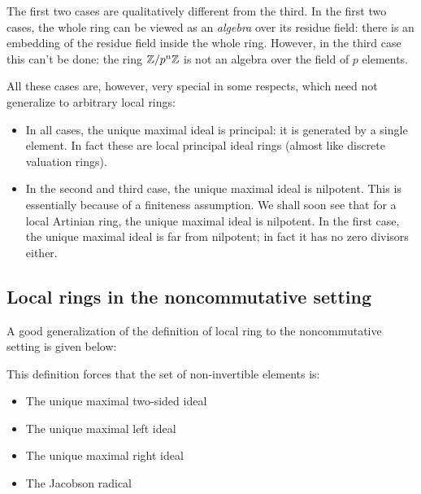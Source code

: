 \documentclass[a4paper]{amsart}
\begin{document}
The first two cases are qualitatively different from the third. In the
first two cases, the whole ring can be viewed as an {\em algebra} over
its residue field: there is an embedding of the residue field inside
the whole ring. However, in the third case this can't be done: the
ring $\mathbb{Z}/p^n\mathbb{Z}$ is not an algebra over the field of $p$ elements.

All these cases are, however, very special in some respects, which
need not generalize to arbitrary local rings:

\begin{itemize}

\item In all cases, the unique maximal ideal is principal: it is
  generated by a single element. In fact these are local principal
  ideal rings (almost like discrete valuation rings).

\item In the second and third case, the unique maximal ideal is
  nilpotent. This is essentially because of a finiteness
  assumption. We shall soon see that for a local Artinian ring, the
  unique maximal ideal is nilpotent. In the first case, the unique
  maximal ideal is far from nilpotent; in fact it has no zero divisors
  either.

\end{itemize}

\subsection{Local rings in the noncommutative setting}

A good generalization of the definition of local ring to the
noncommutative setting is given below:

\begin{definer}
\end{definer}

This definition forces that the set of non-invertible elements is:

\begin{itemize}

\item The unique maximal two-sided ideal

\item The unique maximal left ideal

\item The unique maximal right ideal

\item The Jacobson radical

\end{itemize}
\end{document}
